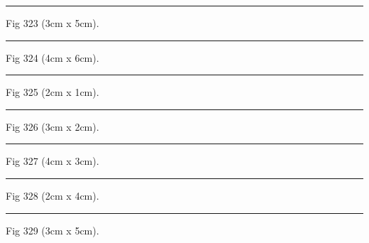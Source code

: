 \documentclass[a4paper,11pt]{article}
\begin{document}
\begin{swarmwrap}%
  \begin{minipage}[t]{3cm}
    \centering
    \rule{\linewidth}{5cm}
    {\footnotesize Fig 323 (3cm x 5cm).}
  \end{minipage}%
\end{swarmwrap}%
\swarmwrapnext
\lipsum[23]%

\begin{swarmwrap}%
  \begin{minipage}[t]{4cm}
    \centering
    \rule{\linewidth}{6cm}
    {\footnotesize Fig 324 (4cm x 6cm).}
  \end{minipage}%
\end{swarmwrap}%
\swarmwrapnext
\lipsum[24]%

\begin{swarmwrap}%
  \begin{minipage}[t]{2cm}
    \centering
    \rule{\linewidth}{1cm}
    {\footnotesize Fig 325 (2cm x 1cm).}
  \end{minipage}%
\end{swarmwrap}%
\swarmwrapnext
\lipsum[25]%

\begin{swarmwrap}%
  \begin{minipage}[t]{3cm}
    \centering
    \rule{\linewidth}{2cm}
    {\footnotesize Fig 326 (3cm x 2cm).}
  \end{minipage}%
\end{swarmwrap}%
\swarmwrapnext
\lipsum[26]%

\begin{swarmwrap}%
  \begin{minipage}[t]{4cm}
    \centering
    \rule{\linewidth}{3cm}
    {\footnotesize Fig 327 (4cm x 3cm).}
  \end{minipage}%
\end{swarmwrap}%
\swarmwrapnext
\lipsum[27]%

\begin{swarmwrap}%
  \begin{minipage}[t]{2cm}
    \centering
    \rule{\linewidth}{4cm}
    {\footnotesize Fig 328 (2cm x 4cm).}
  \end{minipage}%
\end{swarmwrap}%
\swarmwrapnext
\lipsum[28]%

\begin{swarmwrap}%
  \begin{minipage}[t]{3cm}
    \centering
    \rule{\linewidth}{5cm}
    {\footnotesize Fig 329 (3cm x 5cm).}
  \end{minipage}%
\end{swarmwrap}%
\swarmwrapnext
\lipsum[29]%
\end{document}
